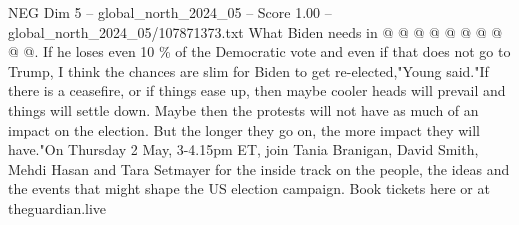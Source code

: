\begin{textsample}{NEG Dim 5 – global\_north\_2024\_05 – Score 1.00 – global\_north\_2024\_05/107871373.txt}
What Biden needs in @ @ @ @ @ @ @ @ @ @.
If he loses even 10 \% of the Democratic vote and even if that does not go to Trump, I think the chances are slim for Biden to get re-elected,"Young said."If there is a ceasefire, or if things ease up, then maybe cooler heads will prevail and things will settle down.
Maybe then the protests will not have as much of an impact on the election.
But the longer they go on, the more impact they will have."On Thursday 2 May, 3-4.15pm ET, join Tania Branigan, David Smith, Mehdi Hasan and Tara Setmayer for the inside track on the people, the ideas and the events that might shape the US election campaign.
Book tickets here or at theguardian.live

\end{textsample}
